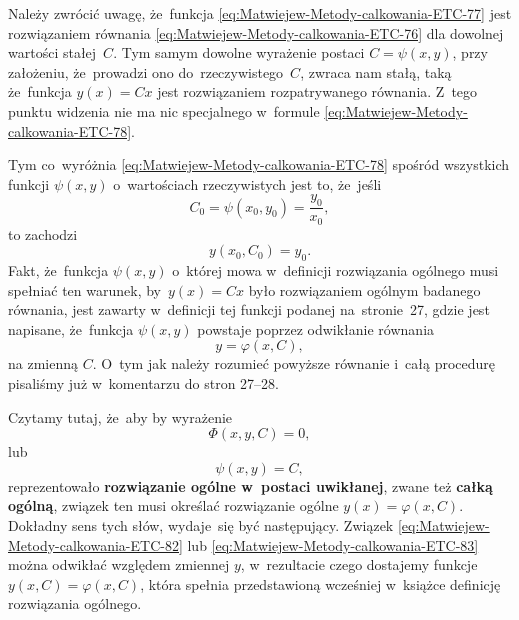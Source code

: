 \documentclass[a4paper,11pt]{article}
\numberwithin{equation}{section}
\begin{document}
Należy zwrócić uwagę, że~funkcja
\eqref{eq:Matwiejew-Metody-calkowania-ETC-77} jest rozwiązaniem równania
\eqref{eq:Matwiejew-Metody-calkowania-ETC-76} dla dowolnej wartości
stałej~$C$. Tym samym dowolne wyrażenie postaci $C = \psi( x, y )$, przy
założeniu, że~prowadzi ono do~rzeczywistego~$C$, zwraca nam stałą, taką
że~funkcja $y( x ) = C x$ jest rozwiązaniem rozpatrywanego równania. Z~tego
punktu widzenia nie ma nic specjalnego w~formule
\eqref{eq:Matwiejew-Metody-calkowania-ETC-78}.

Tym co~wyróżnia \eqref{eq:Matwiejew-Metody-calkowania-ETC-78} spośród
wszystkich funkcji $\psi( x, y )$ o~wartościach rzeczywistych jest to,
że~jeśli
\begin{equation}
  \label{eq:Matwiejew-Metody-calkowania-ETC-79}
  C_{ 0 } = \psi( x_{ 0 }, y_{ 0 } ) = \frac{ y_{ 0 } }{ x_{ 0 } },
\end{equation}
to zachodzi
\begin{equation}
  \label{eq:Matwiejew-Metody-calkowania-ETC-80}
  y( x_{ 0 }, C_{ 0 } ) = y_{ 0 }.
\end{equation}
Fakt, że~funkcja $\psi( x, y )$ o~której mowa w~definicji rozwiązania ogólnego
musi spełniać ten warunek, by~$y( x ) = C x$ było rozwiązaniem ogólnym
badanego równania, jest zawarty w~definicji tej funkcji podanej
na~stronie~27, gdzie jest napisane, że~funkcja $\psi( x, y )$ powstaje
poprzez odwikłanie równania
\begin{equation}
  \label{eq:Matwiejew-Metody-calkowania-ETC-81}
  y = \varphi( x, C ),
\end{equation}
na zmienną $C$. O~tym jak należy rozumieć powyższe równanie i~całą procedurę
pisaliśmy już w~komentarzu do stron 27--28.

\VerSpaceFour





\noindent
Czytamy tutaj, że~aby by wyrażenie
\begin{equation}
  \label{eq:Matwiejew-Metody-calkowania-ETC-82}
  \Phi( x, y, C ) = 0,
\end{equation}
lub
\begin{equation}
  \label{eq:Matwiejew-Metody-calkowania-ETC-83}
  \psi( x, y ) = C,
\end{equation}
reprezentowało \textbf{rozwiązanie ogólne w~postaci uwikłanej}, zwane też
\textbf{całką ogólną}, związek ten musi określać rozwiązanie ogólne
$y( x ) = \varphi( x, C )$. Dokładny sens tych słów, wydaje~się być następujący.
Związek \eqref{eq:Matwiejew-Metody-calkowania-ETC-82} lub
\eqref{eq:Matwiejew-Metody-calkowania-ETC-83} można odwikłać względem
zmiennej $y$, w~rezultacie czego dostajemy funkcje $y( x, C ) = \varphi( x, C )$,
która spełnia przedstawioną wcześniej w~książce definicję rozwiązania
ogólnego.
\end{document}
